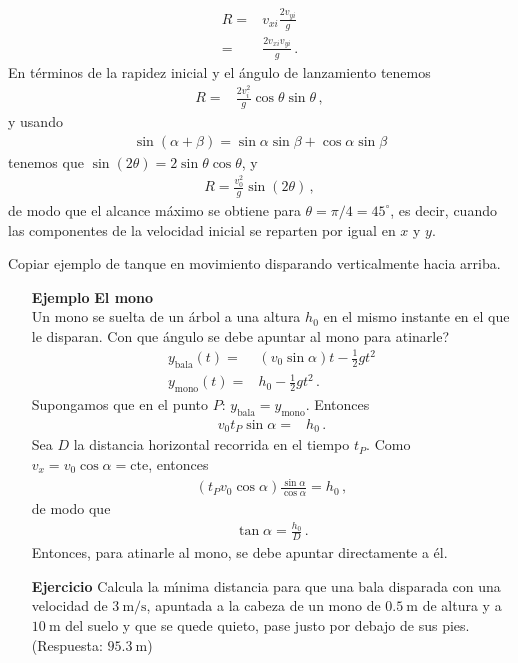 \begin{enumerate}
\begin{align}
  R=&v_{xi}\frac{2v_{yi}}{g}\nonumber\\
  =&\frac{2v_{xi}v_{yi}}{g}\,.
\end{align}
En términos de la rapidez inicial y el ángulo de lanzamiento tenemos
\begin{align}
  R=&\frac{2v^2_i}{g}\cos\theta\sin\theta\,,
\end{align}
y usando
\begin{align}
  \sin(\alpha+\beta)=\sin\alpha\sin\beta+\cos\alpha\sin\beta
\end{align}
tenemos que $\sin(2\theta)=2\sin\theta\cos\theta$, y
\begin{align}
  R=\frac{v_0^2}{g}\sin(2\theta)\,,
\end{align}
de modo que el alcance máximo se obtiene para $\theta=\pi/4=45^\circ$,
es decir, cuando las componentes de la velocidad inicial se reparten
por igual en $x$ y $y$.
  \end{enumerate}



\begin{inprogress}
  Copiar ejemplo de tanque en movimiento disparando verticalmente hacia arriba.
\end{inprogress}

\begin{itemize}
\item[\textbf{Ejemplo}] \textbf{El mono}\\
Un mono se suelta de un \'arbol a una altura $h_0$ en el mismo instante en el que le disparan. \textquestiondown Con que \'angulo se debe apuntar al mono para atinarle?
  \begin{align}
    y_{\text{bala}}(t)=&(v_0\sin\alpha)t-\tfrac{1}{2}g t^2\nonumber\\
    y_{\text{mono}}(t)=&h_0-\tfrac{1}{2}g t^2\,.
  \end{align}
Supongamos que en el punto $P$: $y_{\text{bala}}=y_{\text{mono}}$. Entonces
\begin{align}
  v_0 t_P\sin\alpha=&h_0\,.
\end{align}
Sea $D$ la distancia horizontal recorrida en el tiempo $t_P$. Como $v_x=v_0\cos\alpha=\text{cte}$, entonces
\begin{align}
  (t_Pv_0\cos\alpha)\frac{\sin\alpha}{\cos\alpha}=h_0\,,
\end{align}
de modo que
\begin{align}
  \tan\alpha=\frac{h_0}{D}\,.
\end{align}
Entonces, para atinarle al mono, se debe apuntar directamente a \'el.

\item[\textbf{Ejercicio}]Calcula la m\'\i nima distancia para que una bala disparada con una velocidad de $3\ \text{m/s}$, apuntada a la cabeza de un mono de $0.5\ $m de altura y a $10\ $m del suelo y que se quede quieto, pase justo por debajo de sus pies. (Respuesta: $95.3\ $m)
\end{itemize}





